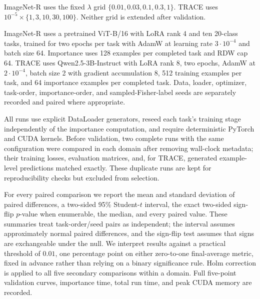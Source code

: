 \begin{table}[H]
\caption{Data splits and repetitions in the held-out evaluation. FOMC is excluded because its distributed evaluation and test files are exact duplicates.}
\label{tab:confirmatory-protocol}
\centering
\small
{}
\end{table}

ImageNet-R uses the fixed $\lambda$ grid $\{0.01,0.03,0.1,0.3,1\}$. TRACE uses $10^{-5}\!\times\!\{1,3,10,30,100\}$. Neither grid is extended after validation.

ImageNet-R uses a pretrained ViT-B/16 with LoRA rank 4 and ten 20-class tasks, trained for two epochs per task with AdamW at learning rate $3\cdot10^{-4}$ and batch size 64. Importance uses 128 examples per completed task and RDW cap 64. TRACE uses Qwen2.5-3B-Instruct with LoRA rank 8, two epochs, AdamW at $2\cdot10^{-4}$, batch size 2 with gradient accumulation 8, 512 training examples per task, and 64 importance examples per completed task. Data, loader, optimizer, task-order, importance-order, and sampled-Fisher-label seeds are separately recorded and paired where appropriate.

All runs use explicit DataLoader generators, reseed each task's training stage independently of the importance computation, and require deterministic PyTorch and CUDA kernels. Before validation, two complete runs with the same configuration were compared in each domain after removing wall-clock metadata; their training losses, evaluation matrices, and, for TRACE, generated example-level predictions matched exactly. These duplicate runs are kept for reproducibility checks but excluded from selection.

For every paired comparison we report the mean and standard deviation of paired differences, a two-sided 95\% Student-$t$ interval, the exact two-sided sign-flip $p$-value when enumerable, the median, and every paired value. These summaries treat task-order/seed pairs as independent; the interval assumes approximately normal paired differences, and the sign-flip test assumes that signs are exchangeable under the null. We interpret results against a practical threshold of $0.01$, one percentage point on either zero-to-one final-average metric, fixed in advance rather than relying on a binary significance rule. Holm correction is applied to all five secondary comparisons within a domain. Full five-point validation curves, importance time, total run time, and peak CUDA memory are recorded.

